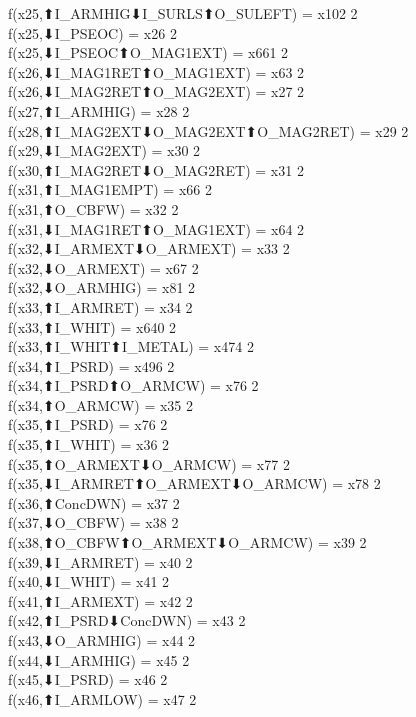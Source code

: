 f(x25,⬆I_ARMHIG⬇I_SURLS⬆O_SULEFT) = x102 {2} \\
f(x25,⬇I_PSEOC) = x26 {2} \\
f(x25,⬇I_PSEOC⬆O_MAG1EXT) = x661 {2} \\
f(x26,⬇I_MAG1RET⬆O_MAG1EXT) = x63 {2} \\
f(x26,⬇I_MAG2RET⬆O_MAG2EXT) = x27 {2} \\
f(x27,⬆I_ARMHIG) = x28 {2} \\
f(x28,⬆I_MAG2EXT⬇O_MAG2EXT⬆O_MAG2RET) = x29 {2} \\
f(x29,⬇I_MAG2EXT) = x30 {2} \\
f(x30,⬆I_MAG2RET⬇O_MAG2RET) = x31 {2} \\
f(x31,⬆I_MAG1EMPT) = x66 {2} \\
f(x31,⬆O_CBFW) = x32 {2} \\
f(x31,⬇I_MAG1RET⬆O_MAG1EXT) = x64 {2} \\
f(x32,⬇I_ARMEXT⬇O_ARMEXT) = x33 {2} \\
f(x32,⬇O_ARMEXT) = x67 {2} \\
f(x32,⬇O_ARMHIG) = x81 {2} \\
f(x33,⬆I_ARMRET) = x34 {2} \\
f(x33,⬆I_WHIT) = x640 {2} \\
f(x33,⬆I_WHIT⬆I_METAL) = x474 {2} \\
f(x34,⬆I_PSRD) = x496 {2} \\
f(x34,⬆I_PSRD⬆O_ARMCW) = x76 {2} \\
f(x34,⬆O_ARMCW) = x35 {2} \\
f(x35,⬆I_PSRD) = x76 {2} \\
f(x35,⬆I_WHIT) = x36 {2} \\
f(x35,⬆O_ARMEXT⬇O_ARMCW) = x77 {2} \\
f(x35,⬇I_ARMRET⬆O_ARMEXT⬇O_ARMCW) = x78 {2} \\
f(x36,⬆ConcDWN) = x37 {2} \\
f(x37,⬇O_CBFW) = x38 {2} \\
f(x38,⬆O_CBFW⬆O_ARMEXT⬇O_ARMCW) = x39 {2} \\
f(x39,⬇I_ARMRET) = x40 {2} \\
f(x40,⬇I_WHIT) = x41 {2} \\
f(x41,⬆I_ARMEXT) = x42 {2} \\
f(x42,⬆I_PSRD⬇ConcDWN) = x43 {2} \\
f(x43,⬇O_ARMHIG) = x44 {2} \\
f(x44,⬇I_ARMHIG) = x45 {2} \\
f(x45,⬇I_PSRD) = x46 {2} \\
f(x46,⬆I_ARMLOW) = x47 {2} \\
